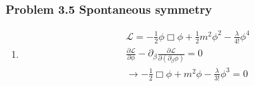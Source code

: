\documentclass[10pt,a4paper]{book}
\theoremstyle{definition}
\begin{document}
\subsubsection{Problem 3.5 Spontaneous symmetry}
\begin{enumerate}
    \item 
    \begin{align}
    \mathscr{L}=-\frac{1}{2}\phi\Box\phi+\frac{1}{2}m^2\phi^2-\frac{\lambda}{4!}\phi^4\\
    \frac{\partial\mathscr{L}}{\partial \phi}-\partial_\beta\frac{\partial\mathscr{L}}{\partial(\partial_\beta \phi)}=0\\
    \rightarrow -\frac{1}{2}\Box\phi+m^2\phi-\frac{\lambda}{3!}\phi^3=0
\end{align}
\end{enumerate}
\end{document}
